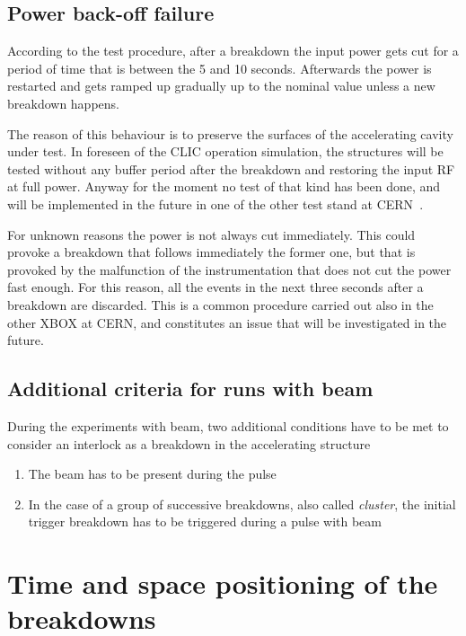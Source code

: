 \subsection{Power back-off failure}
\label{sec:pbof}

According to the test procedure, after a breakdown the input power gets cut for a period of time that is between the 5 and 10 seconds. Afterwards the power is restarted and gets ramped up gradually up to the nominal value unless a new breakdown happens.

The reason of this behaviour is to preserve the surfaces of the accelerating cavity under test. In foreseen of the CLIC operation simulation, the structures will be tested without any buffer period after the breakdown and restoring the input RF at full power. Anyway for the moment no test of that kind has been done, and will be implemented in the future in one of the other test stand at CERN~\cite{Walter:PC}.

For unknown reasons the power is not always cut immediately. This could provoke a breakdown that follows immediately the former one, but that is provoked by the malfunction of the instrumentation that does not cut the power fast enough. For this reason, all the events in the next three seconds after a breakdown are discarded. This is a common procedure carried out also in the other XBOX at CERN, and constitutes an issue that will be investigated in the future. 


\subsection[Additional criteria for runs with beam]{Additional criteria for runs with beam}

During the experiments with beam, two additional conditions have to be met to consider an interlock as a breakdown in the accelerating structure
\begin{enumerate}
\item The beam has to be present during the pulse
\item In the case of a group of successive breakdowns, also called \textit{cluster}, the initial trigger breakdown has to be triggered during a pulse with beam
\end{enumerate}





\section[Time and space positioning of the breakdowns]{Time and space positioning of the breakdowns}

